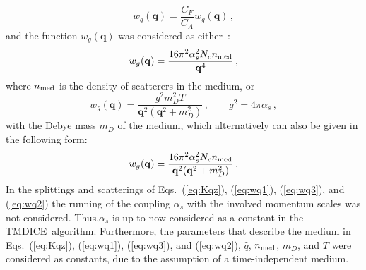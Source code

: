 \documentclass[preprint,12pt]{elsarticle}
\newcommand{\tmdice}{{\sf TMDICE}}
\begin{document}
%
\begin{equation}
w_q(\mathbf{q})=\frac{C_F}{C_A}w_g(\mathbf{q})\,,
\label{eq:relation_q_to_g}
\end{equation}
and the function $w_g(\mathbf{q})$ 
was considered as either~\cite{Blaizot:2014rla}:
\begin{equation}
 w_g(\mathbf{q}) = \frac{16\pi^2\alpha_s^2N_cn_{\rm med}}{\mathbf{q}^4}\,,
\label{eq:wq1}
\end{equation}
where $n_{\rm med}$ is the density of scatterers in the medium,
or~\cite{Gyulassy:1993hr}
\begin{equation}
 w_g(\mathbf{q}) = \frac{g^2m_D^2T}{\mathbf{q}^2(\mathbf{q}^2+m_D^2)}\,,
 \qquad g^2 = 4\pi\alpha_s\,,
\label{eq:wq3}
\end{equation}
with the Debye mass $m_D$ of the medium,
which alternatively can also be given in the following form:
\begin{equation}
 w_g(\mathbf{q}) = \frac{16\pi^2\alpha_s^2N_cn_{\rm med}}{\mathbf{q}^2(\mathbf{q}^2+m_D^2)}\,.
\label{eq:wq2}
\end{equation}
In the splittings and scatterings of Eqs.~(\ref{eq:Kqz}), (\ref{eq:wq1}), (\ref{eq:wq3}), and (\ref{eq:wq2}) the running of the coupling $\alpha_s$ with the involved momentum scales was not considered. Thus,$\alpha_s$ is up to now considered as a constant in the \tmdice~algorithm. Furthermore, the parameters that describe the medium in Eqs.~(\ref{eq:Kqz}), (\ref{eq:wq1}), (\ref{eq:wq3}), and (\ref{eq:wq2}), $\hat{q}$, $n_{\rm med}$, $m_D$, and $T$ were considered as  constants, due to the assumption of a time-independent medium.
\end{document}
